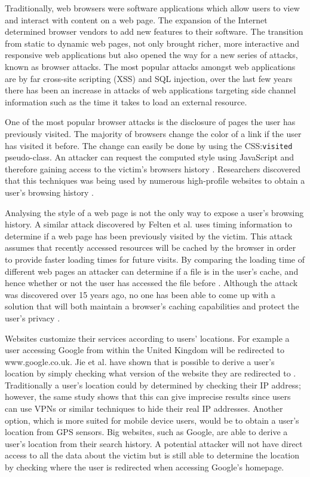 \documentclass[10pt,a4paper,twoside]{book}
\begin{document}
Traditionally, web browsers were software applications which allow users to view and interact with content on a web page. The expansion of the Internet determined browser vendors to add new features to their software. The transition from static to dynamic web pages, not only brought richer, more interactive and responsive web applications but also opened the way for a new series of attacks, known as browser attacks. The most popular attacks amongst web applications are by far cross-site scripting (XSS) and SQL injection, over the last few years there has been an increase in attacks of web applications targeting side channel information such as the time it takes to load an external resource.

One of the most popular browser attacks is the disclosure of pages the user has previously visited. The majority of browsers change the color of a link if the user has visited it before. The change can easily be done by using the CSS:\texttt{visited} pseudo-class. An attacker can request the computed style using JavaScript and therefore gaining access to the victim's browsers history \cite{cssvisited, van2015clock}. Researchers discovered that this techniques was being used by numerous high-profile websites to obtain a user's browsing history \cite{jang2010empirical}.

Analysing the style of a web page is not the only way to expose a user's browsing history. A similar attack discovered by Felten et al. \cite{felten2000timing} uses timing information to determine if a web page has been previously visited by the victim. This attack assumes that recently accessed resources will be cached by the browser in order to provide faster loading times for future visits. By comparing the loading time of different web pages an attacker can determine if a file is in the user's cache, and hence whether or not the user has accessed the file before . Although the attack was discovered over 15 years ago, no one has been able to come up with a solution that will both maintain a browser's caching capabilities and protect the user's privacy \cite{van2015clock}.

Websites customize their services according to users' locations. For example a user accessing Google from within the United Kingdom will be redirected to www.google.co.uk. Jie et al. have shown that is possible to derive a user's location by simply checking what version of the website they are redirected to \cite{jia2015know}. Traditionally a user's location could by determined by checking their IP address; however, the same study shows that this can give imprecise results since users can use VPNs or similar techniques to hide their real IP addresses. Another option, which is more suited for mobile device users, would be to obtain a user's location from GPS sensors. Big websites, such as Google, are able to derive a user's location from their search history. A potential attacker will not have direct access to all the data about the victim but is still able to determine the location by checking where the user is redirected when accessing Google's homepage.
\end{document}

